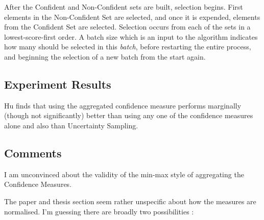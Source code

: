 \documentclass[a4paper,11pt]{report}
\begin{document}
After the Confident and Non-Confident sets are built, selection begins. First elements in the Non-Confident Set are selected, and once it is expended, elements from the Confident Set are selected. Selection occurs from each of the sets in a lowest-score-first order. A batch size which is an input to the algorithm indicates how many should be selected in this \emph{batch}, before restarting the entire process, and beginning the selection of a new batch from the start again.

\subsection{Experiment Results}
Hu finds that using the aggregated confidence measure performs marginally (though not significantly) better than using any one of the confidence measures alone and also than Uncertainty Sampling.


\subsection{Comments}
I am unconvinced about the validity of the min-max style of aggregating the Confidence Measures.

The paper and thesis section seem rather unspecific about how the measures are normalised. I'm guessing there are broadly two possibilities :
\end{document}
